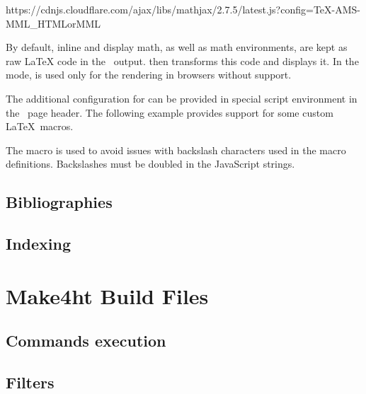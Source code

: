 \documentclass{book}
\begin{document}
\begin{texsource}
{https://cdnjs.cloudflare.com/ajax/libs/mathjax/2.7.5/latest.js?config=TeX-AMS-MML_HTMLorMML}
\end{texsource}

By default, inline and display math, as well as math environments, are kept as
raw LaTeX code in the \HTML\ output.  then transforms this code
and displays it. In the  mode,  is used only for the
rendering in browsers without  support. 

The additional configuration for  can be provided in special
script environment in the \HTML\ page header. The following example provides
support for some custom \LaTeX\ macros.

\begin{texsource}
\end{texsource}

The \texcommand{\detokenize} macro is used to avoid issues with backslash
characters used in the macro definitions. Backslashes must be doubled in the
JavaScript strings.


\section{Bibliographies}
\section{Indexing}

\chapter{Make4ht Build Files}
\section{Commands execution}
\section{Filters}
\end{document}
